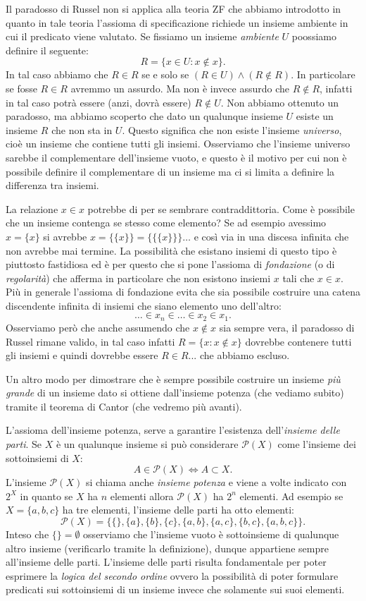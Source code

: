 \documentclass[italian,a4paper,hidelinks,headinclude]{scrartcl}
\renewcommand{\P}{{\mathcal P}}
\newcommand{\myemph}[1]{\emph{#1}\marginpar{#1}}
\begin{document}
Il paradosso di Russel non si applica alla teoria ZF che abbiamo introdotto
in quanto in tale teoria l'assioma di specificazione richiede un insieme
ambiente in cui il predicato viene valutato.
Se fissiamo un insieme \emph{ambiente} $U$ poossiamo definire il seguente:
\[
  R = \{ x \in U \colon x \not \in x\}.
\]
In tal caso abbiamo che $R\in R$ se e solo se $(R\in U) \land (R \not \in R)$.
In particolare se fosse $R\in R$ avremmo un assurdo. Ma non è invece
assurdo che $R\not \in R$, infatti in tal caso potrà essere (anzi, dovrà essere)
$R\not \in U$.
Non abbiamo ottenuto un paradosso, ma abbiamo scoperto che dato
un qualunque insieme $U$ esiste un insieme $R$ che non sta in $U$.
Questo significa che non esiste l'insieme \myemph{universo}, cioè un insieme che
contiene tutti gli insiemi. Osserviamo che l'insieme universo sarebbe il complementare
dell'insieme vuoto, e questo è il motivo per cui non è possibile definire
il complementare di un insieme ma ci si limita a definire la differenza tra insiemi.

La relazione $x\in x$ potrebbe di per se sembrare contraddittoria.
Come è possibile che un insieme contenga se stesso come elemento?
Se ad esempio avessimo $x=\{ x\}$ si avrebbe $x=\{\{x\}\} = \{\{\{ x\}\}\} \dots$
e così via in una discesa infinita che non avrebbe mai termine.
La possibilità che esistano insiemi di questo tipo è piuttosto fastidiosa ed è per questo
che si pone l'assioma di \emph{fondazione} (o di \emph{regolarità}) che afferma
in particolare che non esistono insiemi $x$ tali che $x\in x$.
Più in generale l'assioma di fondazione evita che sia possibile
costruire una catena discendente infinita di insiemi che siano
elemento uno dell'altro:
\[
  \dots \in x_n \in \dots \in x_2 \in x_1.
\]
Osserviamo però che anche assumendo che $x\not\in x$ sia sempre vera,
il paradosso di Russel rimane valido, in tal caso infatti
$R=\{x\colon x\not \in x\}$ dovrebbe contenere
tutti gli insiemi e quindi dovrebbe essere $R\in R$... che abbiamo escluso.

Un altro modo per dimostrare che è sempre possibile costruire un
insieme \emph{più grande} di un insieme dato si ottiene dall'insieme potenza
(che vediamo subito) tramite il teorema di Cantor (che vedremo più avanti).

L'assioma dell'insieme potenza, serve
a garantire l'esistenza del\-l'\myemph{insieme delle parti}.
Se $X$ è un qualunque insieme si può considerare $\P(X)$ come l'insieme dei
sottoinsiemi di $X$:
\[
 A \in \P(X) \iff A \subset X.
\]
L'insieme $\P(X)$ si chiama anche \emph{insieme potenza} e viene a volte indicato con $2^X$
in quanto se $X$ ha $n$ elementi allora $\P(X)$ ha $2^n$ elementi.
Ad esempio se $X=\{a, b, c\}$ ha tre elementi, l'insieme delle parti
ha otto elementi:
\[
 \P(X) = \{ \{\}, \{a\}, \{b\}, \{c\}, \{a,b\},
   \{a,c\}, \{b,c\}, \{a,b,c\}\}.
\]
Inteso che $\{\}=\emptyset$ osserviamo che l'insieme vuoto è sottoinsieme di
qualunque altro insieme (verificarlo tramite la definizione),
dunque appartiene sempre all'insieme delle parti.
L'insieme delle parti risulta fondamentale per poter esprimere
la \emph{logica del secondo ordine} ovvero la possibilità di poter
formulare predicati sui sottoinsiemi di un insieme invece che solamente
sui suoi elementi.
\end{document}
